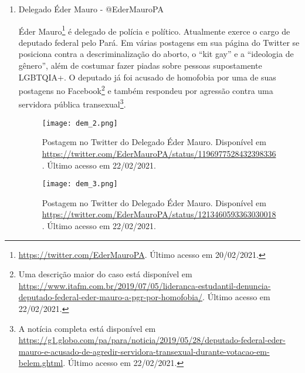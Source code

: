 \documentclass[
	12pt,				%
	openright,			%
	twoside,			%
	a4paper,			%
	english,			%
	brazil				%
	]{abntex2}
\begin{document}
\begin{anexosenv}
\begin{enumerate}
 
 
 \item Delegado Éder Mauro - @EderMauroPA
 
 Éder Mauro\footnote{\url{https://twitter.com/EderMauroPA}. Último acesso em 20/02/2021.} é delegado de polícia e político. Atualmente exerce o cargo de deputado federal pelo Pará. Em várias postagens em sua página do Twitter se posiciona contra a descriminalização do aborto, o ``kit gay'' e a ``ideologia de gênero'', além de costumar fazer piadas sobre pessoas supostamente LGBTQIA+. O deputado já foi acusado de homofobia por uma de suas postagens no Facebook\footnote{Uma descrição maior do caso está disponível em \url{https://www.itafm.com.br/2019/07/05/lideranca-estudantil-denuncia-deputado-federal-eder-mauro-a-pgr-por-homofobia/}. Último acesso em 22/02/2021.} e também respondeu por agressão contra uma servidora pública transexual\footnote{A notícia completa está disponível em \url{https://g1.globo.com/pa/para/noticia/2019/05/28/deputado-federal-eder-mauro-e-acusado-de-agredir-servidora-transexual-durante-votacao-em-belem.ghtml}. Último acesso em 22/02/2021.}.
 
 \begin{figure}[!htbp]
    \centering
    \texttt{[image: dem\_2.png]}
    \caption{Postagem no Twitter do Delegado Éder Mauro. Disponível em \url{https://twitter.com/EderMauroPA/status/1196977528432398336}. Último acesso em 22/02/2021.}
 \end{figure}
 
 \begin{figure}[!htbp]
    \centering
    \texttt{[image: dem\_3.png]}
    \caption{Postagem no Twitter do Delegado Éder Mauro. Disponível em \url{https://twitter.com/EderMauroPA/status/1213460593363030018}. Último acesso em 22/02/2021.}
 \end{figure}
 

\end{enumerate}
\end{anexosenv}
\end{document}
